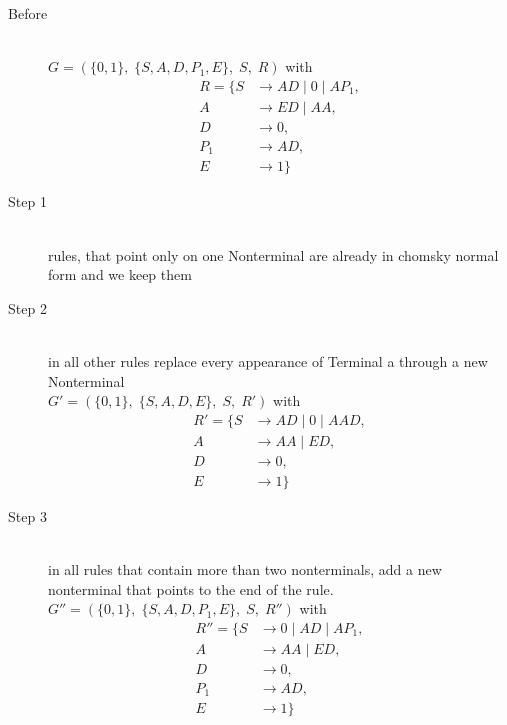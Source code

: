 \documentclass{article}
\begin{document}
\begin{description}
	\item[Before] \hfill \\ 
		$G=\left(\{	0, 1\},\;\{ S, A, D, P_1, E\},\;S,\;R\right)$ with
	\begin{align*}
		R=\{	S &\rightarrow AD\;|\;0\;|\;AP_1, \\ 
		A &\rightarrow ED\;|\;AA, \\ 
		D &\rightarrow 0, \\ 
		P_1 &\rightarrow AD, \\ 
		E &\rightarrow 1\}
	\end{align*}
	\item[Step 1] \hfill \\ 
	rules, that point only on one Nonterminal are already in chomsky normal form and we keep them\\ 
		\item[Step 2] \hfill \\ 
	in all other rules replace every appearance of Terminal a through a new Nonterminal\\ 
	$G'=\left(\{	0, 1\},\;\{ S, A, D, E\},\;S,\;R'\right)$ with
	\begin{align*}
		R'=\{	S &\rightarrow AD\;|\;0\;|\;AAD, \\ 
		A &\rightarrow AA\;|\;ED, \\ 
		D &\rightarrow 0, \\ 
		E &\rightarrow 1\}
	\end{align*}
	\item[Step 3] \hfill \\ 
	in all rules that contain more than two nonterminals, add a new nonterminal that points to the end of the rule.\\ 
	$G''=\left(\{	0, 1\},\;\{ S, A, D, P_1, E\},\;S,\;R''\right)$ with
	\begin{align*}
		R''=\{	S &\rightarrow 0\;|\;AD\;|\;AP_1, \\ 
		A &\rightarrow AA\;|\;ED, \\ 
		D &\rightarrow 0, \\ 
		P_1 &\rightarrow AD, \\ 
		E &\rightarrow 1\}
	\end{align*}
\end{description}
\end{document}
